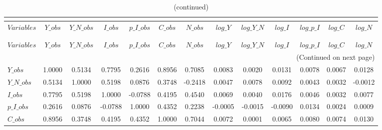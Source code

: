  
\begin{center}
\begin{longtable}{lcccccccccccc} 
\caption{MATRIX OF CORRELATIONS}\\
 \label{Table:th_corr_matrix}\\
\toprule 
$Variables  $	 & 	 $      Y\_obs$	 & 	 $  Y\_N\_obs$	 & 	 $      I\_obs$	 & 	 $  p\_I\_obs$	 & 	 $      C\_obs$	 & 	 $      N\_obs$	 & 	 $      log\_Y$	 & 	 $  log\_Y\_N$	 & 	 $      log\_I$	 & 	 $  log\_p\_I$	 & 	 $      log\_C$	 & 	 $      log\_N$\\
\midrule \endfirsthead 
\caption{(continued)}\\
 \toprule \\ 
$Variables  $	 & 	 $      Y\_obs$	 & 	 $  Y\_N\_obs$	 & 	 $      I\_obs$	 & 	 $  p\_I\_obs$	 & 	 $      C\_obs$	 & 	 $      N\_obs$	 & 	 $      log\_Y$	 & 	 $  log\_Y\_N$	 & 	 $      log\_I$	 & 	 $  log\_p\_I$	 & 	 $      log\_C$	 & 	 $      log\_N$\\
\midrule \endhead 
\midrule \multicolumn{13}{r}{(Continued on next page)} \\ \bottomrule \endfoot 
\bottomrule \endlastfoot 
$Y\_obs     $	 & 	       1.0000	 & 	       0.5134	 & 	       0.7795	 & 	       0.2616	 & 	       0.8956	 & 	       0.7085	 & 	       0.0083	 & 	       0.0020	 & 	       0.0131	 & 	       0.0078	 & 	       0.0067	 & 	       0.0128 \\ 
$Y\_N\_obs  $	 & 	       0.5134	 & 	       1.0000	 & 	       0.5198	 & 	       0.0876	 & 	       0.3748	 & 	      -0.2418	 & 	       0.0047	 & 	       0.0078	 & 	       0.0092	 & 	       0.0043	 & 	       0.0032	 & 	      -0.0012 \\ 
$I\_obs     $	 & 	       0.7795	 & 	       0.5198	 & 	       1.0000	 & 	      -0.0788	 & 	       0.4195	 & 	       0.4540	 & 	       0.0069	 & 	       0.0040	 & 	       0.0176	 & 	       0.0046	 & 	       0.0032	 & 	       0.0077 \\ 
$p\_I\_obs  $	 & 	       0.2616	 & 	       0.0876	 & 	      -0.0788	 & 	       1.0000	 & 	       0.4352	 & 	       0.2238	 & 	      -0.0005	 & 	      -0.0015	 & 	      -0.0090	 & 	       0.0134	 & 	       0.0024	 & 	       0.0009 \\ 
$C\_obs     $	 & 	       0.8956	 & 	       0.3748	 & 	       0.4195	 & 	       0.4352	 & 	       1.0000	 & 	       0.7044	 & 	       0.0072	 & 	       0.0001	 & 	       0.0065	 & 	       0.0080	 & 	       0.0074	 & 	       0.0130 \\ 

\end{longtable}
\end{center}
